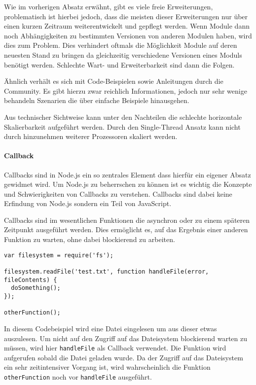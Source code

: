 Wie im vorherigen Absatz erwähnt, gibt es viele freie Erweiterungen,
problematisch ist hierbei jedoch, dass die meisten dieser Erweiterungen
nur über einen kurzen Zeitraum weiterentwickelt und gepflegt werden.
Wenn Module dann noch Abhängigkeiten zu bestimmten Versionen von anderen
Modulen haben, wird dies zum Problem. Dies verhindert oftmals die
Möglichkeit Module auf deren neuesten Stand zu bringen da gleichzeitig
verschiedene Versionen eines Moduls benötigt werden. Schlechte Wart- und
Erweiterbarkeit sind dann die Folgen.

Ähnlich verhält es sich mit Code-Beispielen sowie Anleitungen durch die
Community. Es gibt hierzu zwar reichlich Informationen, jedoch nur sehr
wenige behandeln Szenarien die über einfache Beispiele hinausgehen.

Aus technischer Sichtweise kann unter den Nachteilen die schlechte
horizontale Skalierbarkeit aufgeführt werden. Durch den Single-Thread
Ansatz kann nicht durch hinzunehmen weiterer Prozessoren skaliert
werden.

\paragraph{Callback}\label{callback}

Callbacks sind in Node.js ein so zentrales Element dass hierfür ein
eigener Absatz gewidmet wird. Um Node.js zu beherrschen zu können ist es
wichtig die Konzepte und Schwierigkeiten von Callbacks zu verstehen.
Callbacks sind dabei keine Erfindung von Node.js sondern ein Teil von
JavaScript.

Callbacks sind im wesentlichen Funktionen die asynchron oder zu einem
späteren Zeitpunkt ausgeführt werden. Dies ermöglicht es, auf das
Ergebnis einer anderen Funktion zu warten, ohne dabei blockierend zu
arbeiten.

\begin{verbatim}
var filesystem = require('fs');

filesystem.readFile('test.txt', function handleFile(error, fileContents) {
  doSomething();
});

otherFunction();
\end{verbatim}

In diesem Codebeispiel wird eine Datei eingelesen um aus dieser etwas
auszulesen. Um nicht auf den Zugriff auf das Dateisystem blockierend
warten zu müssen, wird hier \texttt{handleFile} als Callback verwendet.
Die Funktion wird aufgerufen sobald die Datei geladen wurde. Da der
Zugriff auf das Dateisystem ein sehr zeitintensiver Vorgang ist, wird
wahrscheinlich die Funktion \texttt{otherFunction} noch vor
\texttt{handleFile} ausgeführt.

